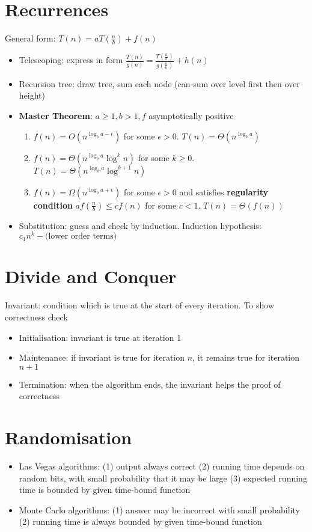 \documentclass[11pt]{article}
\theoremstyle{remark}
\begin{document}
\section{Recurrences}
General form: $T(n)=aT(\frac{n}{b})+f(n)$
\begin{itemize}
    \item Telescoping: express in form $\frac{T(n)}{g(n)}=\frac{T(\frac{n}{b})}{g(\frac{n}{b})}+h(n)$ 
    \item Recursion tree: draw tree, sum each node (can sum over level first then over height)
    \item \textbf{Master Theorem}: $a\geq 1,b>1,f$ asymptotically positive
        \begin{enumerate}
            \item $f(n)=O(n^{\log_b a-\epsilon})$ for some  $\epsilon>0$.  $T(n)=\Theta(n^{\log_b a})$
            \item  $f(n)=\Theta(n^{\log_b a}\log^k n)$ for some  $k\geq 0$.  $T(n)=\Theta(n^{\log_b
                a}\log^{k+1}n)$
            \item  $f(n)=\Omega(n^{\log_b a+\epsilon})$ for some  $\epsilon>0$ and satisfies
                \textbf{regularity condition}  $af(\frac{n}{b})\leq cf(n)$ for some $c<1$.
                $T(n)=\Theta(f(n))$
        \end{enumerate}
    \item Substitution: guess and check by induction. Induction hypothesis: $c_1n^k-\text{(lower order
        terms)}$
\end{itemize}
\section{Divide and Conquer}
Invariant: condition which is true at the start of every iteration. To show correctness check
\begin{itemize}
    \item Initialisation: invariant is true at iteration 1
    \item Maintenance: if invariant is true for iteration $n$, it remains true for iteration $n+1$ 
    \item Termination: when the algorithm ends, the invariant helps the proof of correctness
\end{itemize}
\section{Randomisation}
\begin{itemize}
    \item Las Vegas algorithms: (1) output always correct (2) running time depends on random bits, with
        small probability that it may be large (3) expected running time is bounded by given time-bound
        function
    \item Monte Carlo algorithms: (1) answer may be incorrect with small probability (2) running time is always bounded by given time-bound function
\end{itemize}
\end{document}
